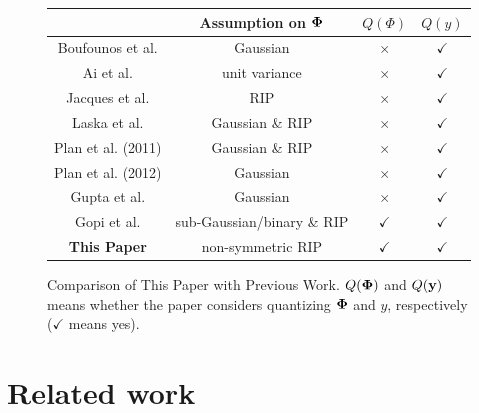 \documentclass[aoas,preprint]{imsart}
\numberwithin{equation}{section}
\theoremstyle{plain}
\begin{document}



\begin{figure}[t]
\small
\centering
\begin{tabular}{c|c|cc}
\hline
                   & Assumption on ${\bf \Phi}$ & $Q(\Phi)$ & $Q(y)$ \\
\hline
 Boufounos et al.
 & Gaussian  &$\times$ & $\checkmark$\\
 Ai et al.         & unit variance &$\times$ & $\checkmark$\\
 Jacques et al.     &  RIP & $\times$& $\checkmark$\\
 Laska et al.     & Gaussian \& RIP &$\times$ & $\checkmark$\\
 Plan et al. (2011)     & Gaussian \& RIP &$\times$ & $\checkmark$\\
 Plan et al. (2012)      & Gaussian &$\times$ & $\checkmark$\\
 Gupta et al.     & Gaussian &$\times$ & $\checkmark$\\
 Gopi et al.       & sub-Gaussian/binary \& RIP &$\checkmark$ & $\checkmark$\\
\hline
  {\bf This Paper}                & non-symmetric RIP & $\checkmark$ & $\checkmark$ \\
\hline
\end{tabular}
\caption{Comparison of This Paper with Previous Work. $Q({\bf \Phi})$ and $Q({\bf y})$ means whether
the paper considers quantizing ${\bf \Phi}$ and $y$,
respectively ($\checkmark$ means yes).}
\label{tab:cs}
\end{figure}



\section{Related work}\label{section_related_work}
\end{document}

